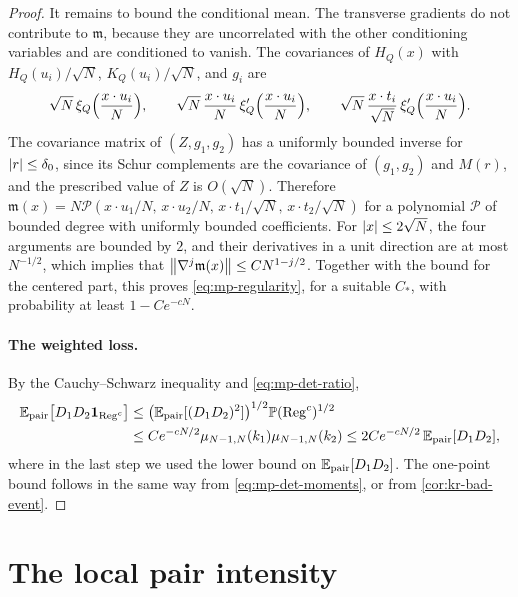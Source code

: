 \begin{proof}
It remains to bound the conditional mean. The transverse gradients do not contribute to $\mathfrak m$, because they are uncorrelated with the other conditioning variables and are conditioned to vanish. The covariances of $H_Q(x)$ with $H_Q(u_i)/\sqrt N$, $K_Q(u_i)/\sqrt N$, and $g_i$ are
\[
\sqrt N\,\xi_Q\Bigl(\frac{x\cdot u_i}N\Bigr),\qquad \sqrt N\,\frac{x\cdot u_i}N\,\xi_Q'\Bigl(\frac{x\cdot u_i}N\Bigr),\qquad \sqrt N\,\frac{x\cdot t_i}{\sqrt N}\,\xi_Q'\Bigl(\frac{x\cdot u_i}N\Bigr).
\]
The covariance matrix of $(Z,g_1,g_2)$ has a uniformly bounded inverse for $\left|r\right|\le\delta_0$, since its Schur complements are the covariance of $(g_1,g_2)$ and $M(r)$, and the prescribed value of $Z$ is $O(\sqrt N)$. Therefore $\mathfrak m(x)=N\mathcal P(x\cdot u_1/N,\,x\cdot u_2/N,\,x\cdot t_1/\sqrt N,\,x\cdot t_2/\sqrt N)$ for a polynomial $\mathcal P$ of bounded degree with uniformly bounded coefficients. For $\left|x\right|\le2\sqrt N$, the four arguments are bounded by $2$, and their derivatives in a unit direction are at most $N^{-1/2}$, which implies that $\left\lVert\nabla^j\mathfrak m(x)\right\rVert\le CN^{1-j/2}$. Together with the bound for the centered part, this proves \eqref{eq:mp-regularity}, for a suitable $C_*$, with probability at least $1-Ce^{-cN}$.

\paragraph{The weighted loss.}
By the Cauchy--Schwarz inequality and \eqref{eq:mp-det-ratio},
\[
\begin{aligned}
\mathbb E_{\mathrm{pair}}\bigl[D_1D_2\mathbf 1_{\mathrm{Reg}^c}\bigr]&\le\bigl(\mathbb E_{\mathrm{pair}}[(D_1D_2)^2]\bigr)^{1/2}\mathbb P(\mathrm{Reg}^c)^{1/2}\\
&\le Ce^{-cN/2}\mu_{N-1,N}(k_1)\mu_{N-1,N}(k_2)\le2Ce^{-cN/2}\,\mathbb E_{\mathrm{pair}}[D_1D_2],
\end{aligned}
\]
where in the last step we used the lower bound on $\mathbb E_{\mathrm{pair}}[D_1D_2]$. The one-point bound follows in the same way from \eqref{eq:mp-det-moments}, or from \cref{cor:kr-bad-event}.
\end{proof}


\section{The local pair intensity}\label{sec:mp-pair}

